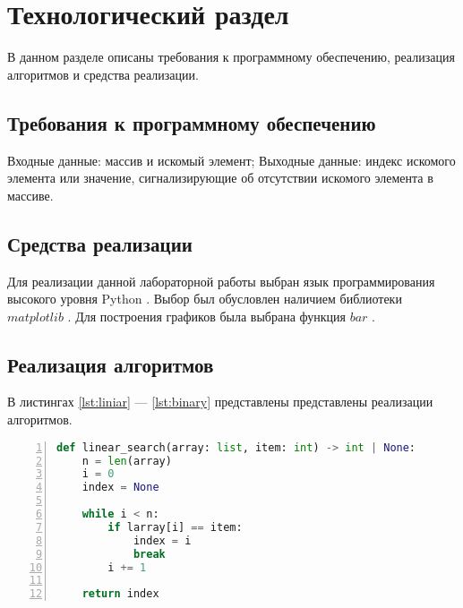 \chapter{Технологический раздел}

В данном разделе описаны требования к программному обеспечению, реализация алгоритмов и средства реализации.

\section{Требования к программному обеспечению}

Входные данные: массив и искомый элемент;
Выходные данные: индекс искомого элемента или значение, сигнализирующие об отсутствии искомого элемента в массиве.


\section{Средства реализации}
Для реализации данной лабораторной работы выбран язык программирования высокого уровня Python \cite{python}. Выбор был обусловлен наличием библиотеки $matplotlib$ \cite{python_matplotlib}. Для построения графиков была выбрана функция $bar$ \cite{python_matplotlib_bar}.

\section{Реализация алгоритмов}
В листингах \ref{lst:liniar} --- \ref{lst:binary} представлены представлены реализации алгоритмов.

\begin{center}
\captionsetup{justification=raggedright,singlelinecheck=off}
\begin{lstlisting}[language=Python, frame=single, numbers=left, label=lst:liniar, caption=Реализация алгоритма линейного поиска]
def linear_search(array: list, item: int) -> int | None:
    n = len(array)
    i = 0
    index = None
    
    while i < n:
        if larray[i] == item:
            index = i
            break
        i += 1
        
    return index
\end{lstlisting}
\end{center}

\clearpage

